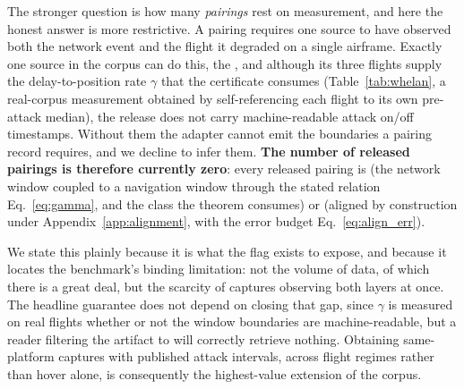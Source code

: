 The stronger question is how many \emph{pairings} rest on measurement, and here
the honest answer is more restrictive. A  pairing
requires one source to have observed both the network event and the flight it
degraded on a single airframe. Exactly one source in the corpus can do this, the
, and although its three flights supply the
delay-to-position rate $\gamma$ that the certificate consumes
(Table~\ref{tab:whelan}, a real-corpus measurement obtained by
self-referencing each flight to its own pre-attack median), the release does not
carry machine-readable attack on/off timestamps. Without them the adapter cannot
emit the  boundaries a pairing record requires, and we decline
to infer them. \textbf{The number of released 
pairings is therefore currently zero}: every released pairing is
 (the network window coupled to a navigation window through
the stated relation Eq.~\eqref{eq:gamma}, and the class the theorem consumes) or
 (aligned by construction under
Appendix~\ref{app:alignment}, with the error budget Eq.~\eqref{eq:align_err}).

We state this plainly because it is what the flag exists to expose, and because
it locates the benchmark's binding limitation: not the volume of data, of which
there is a great deal, but the scarcity of captures observing both layers at
once. The headline guarantee does not depend on closing that gap, since $\gamma$
is measured on real flights whether or not the window boundaries are
machine-readable, but a reader filtering the artifact to
 will correctly retrieve nothing. Obtaining
same-platform captures with published attack intervals, across flight regimes
rather than hover alone, is consequently the highest-value extension of the
corpus.

\begin{table}[t]
\centering
\caption{Acquisition provenance across the ingested corpus. Counts are from the
schema-validated adapter outputs; the split is machine-generated by
 so the paper cannot drift from the
artifact. Acquisition is a property of the \emph{source}; the strictly stronger
 distribution is discussed in the text.}
\label{tab:provenance}
\small
\renewcommand{\arraystretch}{1.05}

\end{table}

